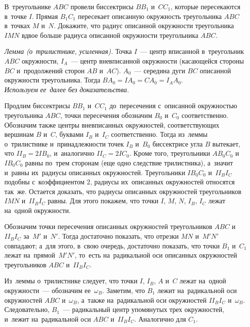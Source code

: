 \begin{problems}

\item
В~треугольнике $ABC$ провели биссектрисы $B B_1$ и~$C C_1$, которые
пересекаются в~точке $I$.
Прямая $B_1 C_1$ пересекает описанную окружность треугольника $ABC$
в~точках $M$ и~$N$.
Докажите, что радиус описанной окружности треугольника $IMN$ вдвое больше
радиуса описанной окружности треугольника $ABC$.

\end{problems}

\ifincludesolutions
\begin{figure}[ht]\begin{center}
\end{center}\end{figure}
\emph{Лемма (о~трилистнике, усиленная).}
Точка $I$~— центр вписанной в~треугольник $ABC$ окружности, $I_A$~— центр
вневписанной окружности (касающейся стороны~$BC$ и~продолжений сторон
$AB$ и~$AC$).
$A_0$~— середина дуги $BC$ описанной окружности треугольника.
Тогда $B A_0 = I A_0 = C A_0 = I_A A_0$.
\\
\emph{Используем ее~далее без доказательства.}
\par
Продлим биссектрисы $BB_1$ и~$CC_1$ до~пересечения с~описанной окружностью
треугольника $ABC$, точки пересечения обозначим $B_0$ и~$C_0$ соответственно.
Обозначим также центры вневписанных окружностей, соответствующих вершинам $B$
и~$C$, буквами $I_B$ и~$I_C$ соответственно.
Тогда из~леммы о~трилистнике и~принадлежности точек $I_B$ и~$B_0$ биссектрисе
угла $B$ вытекает, что $II_B = 2IB_0$, и~аналогично $II_C = 2IC_0$.
Кроме того, треугольники $AB_0C_0$ и~$IB_0C_0$ равны по~трем сторонам (еще одно
следствие трилистника), а~значит и~равны их~радиусы описанных окружностей.
Треугольники $IB_0C_0$ и~$II_BI_C$ подобны с~коэффициентом $2$, радиусы их~описанных окружностей относятся так~же.
Остается доказать, что радиусы описанных окружностей треугольников $IMN$ и~$II_BI_C$ равны.
Для этого покажем, что точки $I$, $M$, $N$, $I_B$, $I_C$ лежат на~одной
окружности.
\par
Обозначим точки пересечения описанных окружностей треугольников $ABC$
и~$I I_B I_C$ за~$M'$ и~$N'$.
Тогда достаточно показать, что отрезки $M N$ и~$M'N'$ совпадают;
а~для этого, в~свою очередь, достаточно показать, что точки $B_1$ и~$C_1$ лежат
на~прямой~$M'N'$, то~есть на~радикальной оси описанных окружностей
треугольников $ABC$ и~$I I_B I_C$.
\par
Из~леммы о~трилистнике следует, что точки $I$, $I_B$, $A$ и~$C$ лежат на~одной
окружности~— обозначим ее~$\omega_B$.
Заметим, что $B_1$ лежит на~радикальной оси окружностей $ABC$ и~$\omega_B$,
а~также на~радикальной оси окружностей $I I_B I_C$ и~$\omega_B$.
Следовательно, $B_1$~— радикальный центр упомянутых трех окружностей,
и~лежит на~радикальной оси $ABC$ и~$I I_B I_C$.
Аналогично для $C_1$.
\fi %

\endgroup %

